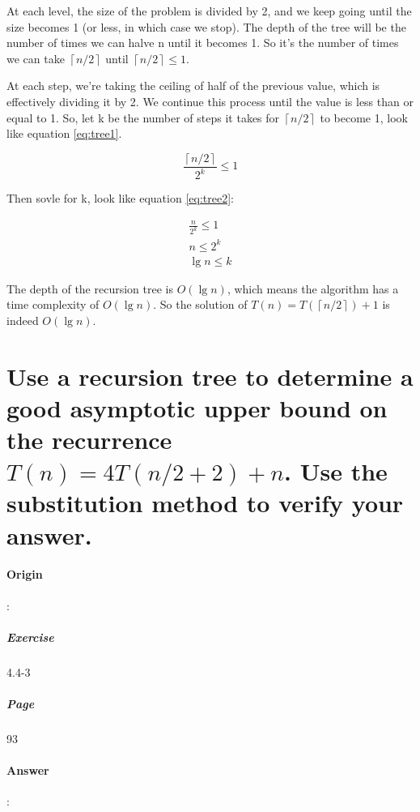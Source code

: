 \documentclass{article}
\begin{document}
  At each level, the size of the problem is divided by 2, and we keep going until the size becomes 1 (or less, in which case we stop). The depth of the tree will be the number of times we can halve n until it becomes 1. So it's the number of times we can take $ \left\lceil n/2 \right\rceil $ until $ \left\lceil n/2 \right\rceil \leq  1 $.
  
  At each step, we're taking the ceiling of half of the previous value, which is effectively dividing it by 2. We continue this process until the value is less than or equal to 1. So, let k be the number of steps it takes for $ \left\lceil n/2 \right\rceil $ to become 1, look like equation \eqref{eq:tree1}.

  \begin{equation}
    \frac{\left\lceil n/2 \right\rceil}{2^k}  \leq 1
    \label{eq:tree1}
  \end{equation}

  Then sovle for k, look like equation \eqref{eq:tree2}:
  
  \begin{equation}
    \begin{aligned}
      \frac{n}{2^k} \leq 1 \\
      n \leq 2^k \\
      \lg n \leq k
    \end{aligned}
    \label{eq:tree2}
  \end{equation}

  The depth of the recursion tree is $ O(\lg n) $, which means the algorithm has a time complexity of $ O(\lg n) $. So the solution of  $ T \left(n\right) = T \left(\left\lceil n/2 \right\rceil\right) + 1 $ is indeed $ O(\lg n) $.

  \section{Use a recursion tree to determine a good asymptotic upper bound on the recurrence $ T \left(n\right) = 4T \left( n/2 + 2 \right) + n  $. Use the substitution method to verify your answer.}
    \paragraph{Origin}:
      \subparagraph{Exercise}4.4-3
      \subparagraph{Page}93
    \paragraph{Answer}:
\end{document}
